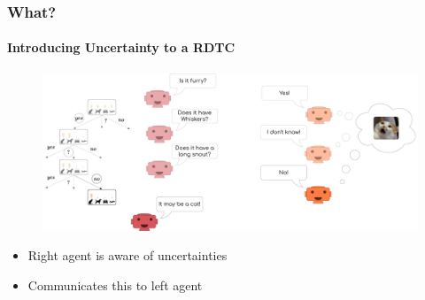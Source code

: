 \documentclass[9pt]{beamer}
\begin{document}
\begin{frame}
\frametitle{What?}
\framesubtitle{Introducing Uncertainty to a RDTC}
\begin{figure}
	\centering
	\includegraphics[width=1\textwidth]{images/urdtc_intuition.pdf}
\end{figure}
\begin{itemize}%
	\item Right agent is aware of uncertainties
	\item Communicates this to left agent
\end{itemize}
\end{frame} 
\end{document}
